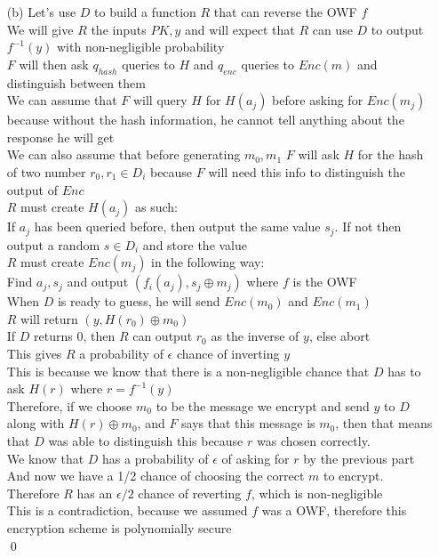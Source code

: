 \documentclass[11pt]{article}
\theoremstyle{definition}
\begin{document}
\begin{enumerate}
	\item[(b)] Let's use $D$ to build a function $R$ that can reverse the OWF $f$\\
We will give $R$ the inputs $PK, y$ and will expect that $R$ can use $D$ to output $f^{-1}(y)$ with non-negligible probability\\
$F$ will then ask $q_{hash}$ queries to $H$ and $q_{enc}$ queries to $Enc(m)$ and distinguish between them\\
We can assume that $F$ will query $H$ for $H(a_j)$ before asking for $Enc(m_j)$ because without the hash information, he cannot tell anything about the response he will get\\
We can also assume that before generating $m_0,m_1$ $F$ will ask $H$ for the hash of two number $r_0,r_1 \in D_i$ because $F$ will need this info to distinguish the output of $Enc$\\
$R$ must create $H(a_j)$ as such:\\
If $a_j$ has been queried before, then output the same value $s_j$.  If not then output a random $s \in D_i$ and store the value\\
$R$ must create $Enc(m_j)$ in the following way:\\
Find $a_j, s_j$ and output $(f_i(a_j), s_j \oplus m_j)$ where $f$ is the OWF\\
When $D$ is ready to guess, he will send $Enc(m_0)$ and $Enc(m_1)$\\
$R$ will return $(y, H(r_0) \oplus m_0)$\\
If $D$ returns $0$, then $R$ can output $r_0$ as the inverse of $y$, else abort\\
This gives $R$ a probability of $\epsilon$ chance of inverting $y$\\
This is because we know that there is a non-negligible chance that $D$ has to ask $H(r)$ where $r = f^{-1}(y)$\\
Therefore, if we choose $m_0$ to be the message we encrypt and send $y$ to $D$ along with $H(r) \oplus m_0$, and $F$ says that this message is $m_0$, then that means that $D$ was able to distinguish this because $r$ was chosen correctly.\\
We know that $D$ has a probability of $\epsilon$ of asking for $r$ by the previous part\\
And now we have a 1/2 chance of choosing the correct $m$ to encrypt.  Therefore $R$ has an $\epsilon / 2$ chance of reverting $f$, which is non-negligible\\
This is a contradiction, because we assumed $f$ was a OWF, therefore this encryption scheme is polynomially secure\\
\qed

\end{enumerate}
\end{document}
